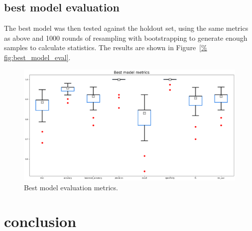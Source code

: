\documentclass[12pt]{article}
\begin{document}
\subsection{best model evaluation}

The best model was then tested against the holdout set, using the same metrics
as above and 1000 rounds of resampling with bootstrapping to generate enough
samples to calculate statistics. The results are shown in Figure~\ref{%
fig:best_model_eval}.

\begin{figure}[H]
    \centering
    \includegraphics[width=\textwidth]{ims/best.png}
    \caption{Best model evaluation metrics.}
    \label{fig:best_model_eval}
\end{figure}


\section{conclusion}

\clearpage
{}


\end{document}
